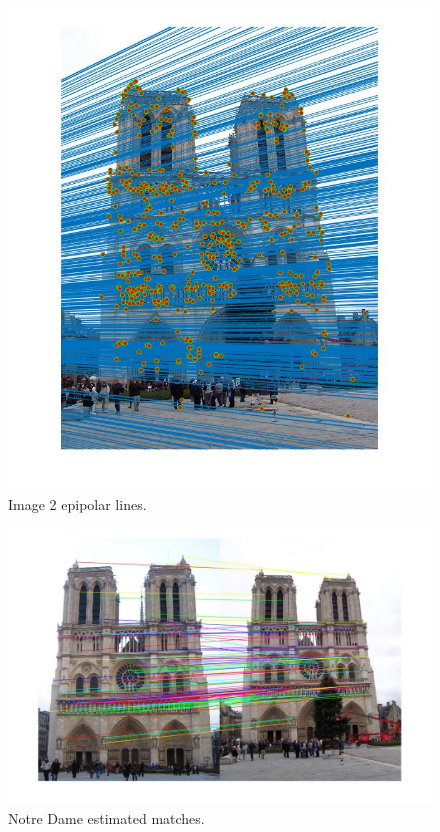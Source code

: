 \documentclass{article}
\begin{document}
\begin{center}
\begin{figure}[H]
\begin{minipage}[b]{0.4\textwidth}
    \includegraphics[scale=0.25]{notre_dame_img2_epipolar_lines.jpg}
    \caption{Image 2 epipolar lines.}
  \end{minipage}
\end{figure}
\end{center}

\begin{center}
\begin{figure}[H]
			\includegraphics[scale = 0.35]{notre_dame_estimated_matches.jpg}
\caption{Notre Dame estimated matches.}
\end{figure}
\end{center}
	
\end{document}
